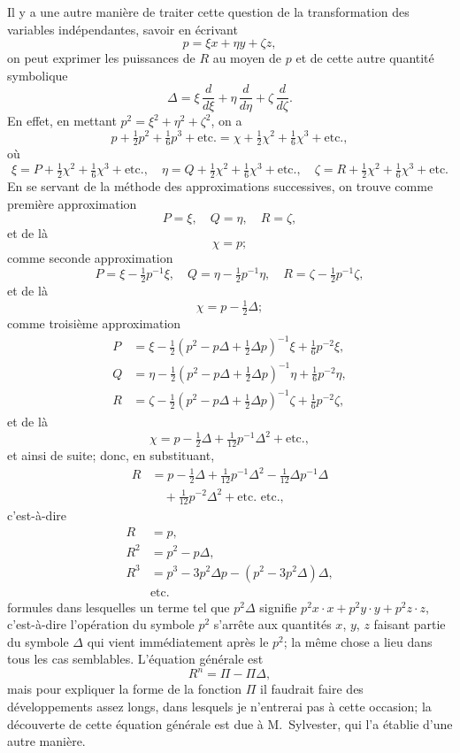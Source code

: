 \documentclass[11pt,a4paper]{book}
\begin{document}
Il y a une autre mani\`{e}re de traiter cette question de la transformation des variables ind\'{e}pendantes, savoir en \'{e}crivant
\[
p=\xi x+\eta y+\zeta z,
\]
on peut exprimer les puissances de $R$ au moyen de $p$ et de cette autre quantit\'{e} symbolique
\[
\Delta=\xi\,\frac{d}{d\xi}+\eta\,\frac{d}{d\eta}+\zeta\,\frac{d}{d\zeta}.
\]
En effet, en mettant $p^2=\xi^2+\eta^2+\zeta^2$, on a
\[
p+\tfrac{1}{2}p^2+\tfrac{1}{6}p^3+\text{etc.}=\chi+\tfrac{1}{2}\chi^2+\tfrac{1}{6}\chi^3+\text{etc.},
\]
o\`{u}
\[
\xi=P+\tfrac{1}{2}\chi^2+\tfrac{1}{6}\chi^3+\text{etc.},\quad
\eta=Q+\tfrac{1}{2}\chi^2+\tfrac{1}{6}\chi^3+\text{etc.},\quad
\zeta=R+\tfrac{1}{2}\chi^2+\tfrac{1}{6}\chi^3+\text{etc.}
\]
En se servant de la m\'{e}thode des approximations successives, on trouve comme premi\`{e}re approximation
\[
P=\xi,\quad Q=\eta,\quad R=\zeta,
\]
et de l\`{a}
\[
\chi=p;
\]
comme seconde approximation
\[
P=\xi-\tfrac{1}{2}p^{-1}\xi,\quad Q=\eta-\tfrac{1}{2}p^{-1}\eta,\quad R=\zeta-\tfrac{1}{2}p^{-1}\zeta,
\]
et de l\`{a}
\[
\chi=p-\tfrac{1}{2}\Delta;
\]
comme troisi\`{e}me approximation
\begin{align*}
P&=\xi-\tfrac{1}{2}(p^2-p\Delta+\tfrac{1}{2}\Delta p)^{-1}\xi+\tfrac{1}{6}p^{-2}\xi,\\
Q&=\eta-\tfrac{1}{2}(p^2-p\Delta+\tfrac{1}{2}\Delta p)^{-1}\eta+\tfrac{1}{6}p^{-2}\eta,\\
R&=\zeta-\tfrac{1}{2}(p^2-p\Delta+\tfrac{1}{2}\Delta p)^{-1}\zeta+\tfrac{1}{6}p^{-2}\zeta,
\end{align*}
et de l\`{a}
\[
\chi=p-\tfrac{1}{2}\Delta+\tfrac{1}{12}p^{-1}\Delta^2+\text{etc.},
\]
et ainsi de suite; donc, en substituant,
\begin{align*}
R&=p-\tfrac{1}{2}\Delta+\tfrac{1}{12}p^{-1}\Delta^2-\tfrac{1}{12}\Delta p^{-1}\Delta\\
&\quad +\tfrac{1}{12}p^{-2}\Delta^2+\text{etc. etc.},
\end{align*}
c'est-\`{a}-dire
\begin{align*}
R&=p,\\
R^2&=p^2-p\Delta,\\
R^3&=p^3-3p^2\Delta p-(p^2-3p^2\Delta)\Delta,\\
&\text{etc.}
\end{align*}
formules dans lesquelles un terme tel que $p^2\Delta$ signifie $p^2x\cdot x+p^2y\cdot y+p^2z\cdot z$, c'est-\`{a}-dire l'op\'{e}ration du symbole $p^2$ s'arr\^{e}te aux quantit\'{e}s $x$, $y$, $z$ faisant partie du symbole $\Delta$ qui vient imm\'{e}diatement apr\`{e}s le $p^2$; la m\^{e}me chose a lieu dans tous les cas semblables. L'\'{e}quation g\'{e}n\'{e}rale est
\[
R^n=\Pi-\Pi\Delta,
\]
mais pour expliquer la forme de la fonction $\Pi$ il faudrait faire des d\'{e}veloppements assez longs, dans lesquels je n'entrerai pas \`{a} cette occasion; la d\'{e}couverte de cette \'{e}quation g\'{e}n\'{e}rale est due \`{a} M.~Sylvester, qui l'a \'{e}tablie d'une autre mani\`{e}re.
\end{document}
